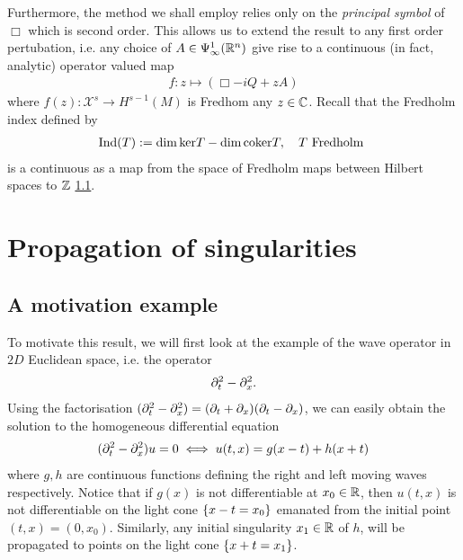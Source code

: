 \documentclass[12pt]{article}
\begin{document}
Furthermore, the method we shall employ relies only on the \emph{principal symbol} of $\Box$ which is second order. This allows us to extend the result to any first order pertubation, i.e. any choice of $A \in \Psi^{1}_{\infty}({\mathbb R}^n)$ give rise to a continuous (in fact, analytic) operator valued map 
\begin{align*}
f : z \mapsto (\Box - iQ + zA)
\end{align*}
where $f(z) : \mathcal{X}^s \to H^{s - 1}(M)$ is Fredhom any $z \in {\ensuremath {\mathbb C}}$. Recall that the Fredholm index defined by
\begin{align*}
\mathrm{Ind}(T) := \dim {\mathrm{ker}} T - \dim {\mathrm{coker}} T, \quad T \text{ Fredholm }
\end{align*}
is a continuous as a map from the space of Fredholm maps between Hilbert spaces to ${\mathbb Z}$ \ref{}. 




\section{Propagation of singularities} 

\subsection{A motivation example} 
To motivate this result, we will first look at the example of the wave operator in $2D$ Euclidean space, i.e. the operator
\begin{align*}
\partial_t^2 - \partial_x^2. 
\end{align*}
Using the factorisation $(\partial_t^2 - \partial_x^2) = (\partial_t + \partial_x) (\partial_t - \partial_x)$, we can easily obtain the solution to the homogeneous differential equation 
\begin{align}
(\partial_t^2 - \partial_x^2) u = 0 \iff u(t, x) = g(x -t) + h(x + t) \label{eq: homogeneous wave in 1d} 
\end{align}
where $g, h$ are continuous functions defining the right and left moving waves respectively. Notice that if $g(x)$ is not differentiable at $x_0 \in {\ensuremath {\mathbb R}}$, then $u(t, x)$ is not differentiable on the light cone $\left\{x - t = x_0\right\}$ emanated from the initial point $(t, x) = (0, x_0)$. Similarly, any initial singularity $x_1 \in {\ensuremath {\mathbb R}}$ of $h$, will be propagated to points on the light cone $\left\{x + t = x_1\right\}$. 

\begin{center}
\end{center}
\end{document}
